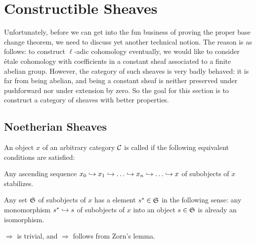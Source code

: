 \section{Constructible Sheaves}\label{sec:Constructible}
Unfortunately, before we can get into the fun business of proving the proper base change theorem, we need to discuss yet another technical notion. The reason is as follows: to construct $\ell$-adic cohomology eventually, we would like to consider étale cohomology with coefficients in a constant sheaf associated to a finite abelian group. However, the category of such sheaves is very badly behaved: it is far from being abelian, and being a constant sheaf is neither preserved under pushforward nor under extension by zero. So the goal for this section is to construct a category of sheaves with better properties.
\subsection{Noetherian Sheaves}
\begin{deflem}\label{def:noetherian}
	An object $x$ of an arbitrary category $\mathcal{C}$ is called  if the following equivalent %
	 conditions are satisfied:
	\begin{alphanumerate}
		\item Any ascending sequence $x_0\monomorphism x_1\monomorphism \dotso\monomorphism x_n\monomorphism \dotso\monomorphism x$ of subobjects of $x$ stabilizes.
		\item Any set $\mathfrak{S}$ of subobjects of $x$ has a  element $s^*\in \mathfrak{S}$ in the following sense: any monomorphism $s^*\monomorphism s$ of subobjects of $x$ into an object $s\in \mathfrak{S}$ is already an isomorphism.
	\end{alphanumerate}
\end{deflem}
\begin{proof*}
	 $\Rightarrow$  is trivial, and  $\Rightarrow$  follows from Zorn's lemma.
\end{proof*}
